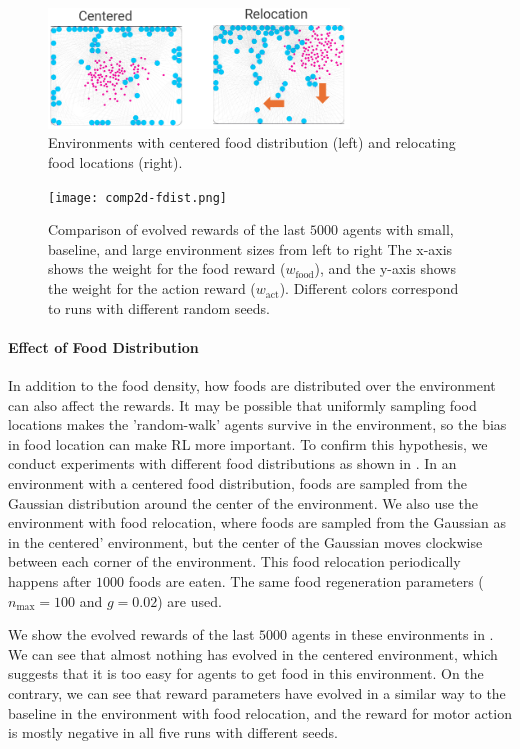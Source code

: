 \begin{figure}[t]
  \centering
  \includegraphics[width=8cm]{resources/centered-and-reloc.png}
  \caption{
    Environments with centered food distribution (left) and relocating food locations (right).
  }\label{figure:env-fdist}
\end{figure}

\begin{figure}[h]
  \centering
  \texttt{[image: comp2d-fdist.png]}
  \caption{
    Comparison of evolved rewards of the last $5000$ agents with small, baseline, and large environment sizes from left to right
    The x-axis shows the weight for the food reward ($w_{\mathrm{food}}$), and the y-axis shows the weight for the action reward ($w_{\mathrm{act}}$).
    Different colors correspond to runs with different random seeds.
  }\label{figure:result-fdist}
\end{figure}

\paragraph{Effect of Food Distribution}
In addition to the food density, how foods are distributed over the environment can also affect the rewards. It may be possible that uniformly sampling food locations makes the 'random-walk' agents survive in the environment, so the bias in food location can make RL more important. To confirm this hypothesis, we conduct experiments with different food distributions as shown in . In an environment with a centered food distribution, foods are sampled from the Gaussian distribution around the center of the environment. We also use the environment with food relocation, where foods are sampled from the Gaussian as in the centered' environment, but the center of the Gaussian moves clockwise between each corner of the environment. This food relocation periodically happens after $1000$ foods are eaten. The same food regeneration parameters ($n_{\mathrm{max}} = 100$ and $g = 0.02$) are used.

We show the evolved rewards of the last $5000$ agents in these environments in . We can see that almost nothing has evolved in the centered environment, which suggests that it is too easy for agents to get food in this environment. On the contrary, we can see that reward parameters have evolved in a similar way to the baseline in the environment with food relocation, and the reward for motor action is mostly negative in all five runs with different seeds.

